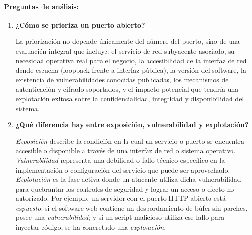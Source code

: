 \paragraph{Preguntas de análisis:}
\begin{enumerate}
    \item \textbf{¿Cómo se prioriza un puerto abierto?}\par
    La priorización no depende únicamente del número del puerto, sino de una evaluación integral que incluye: el servicio de red subyacente asociado, su necesidad operativa real para el negocio, la accesibilidad de la interfaz de red donde escucha (loopback frente a interfaz pública), la versión del software, la existencia de vulnerabilidades conocidas publicadas, los mecanismos de autenticación y cifrado soportados, y el impacto potencial que tendría una explotación exitosa sobre la confidencialidad, integridad y disponibilidad del sistema.
    \item \textbf{¿Qué diferencia hay entre exposición, vulnerabilidad y explotación?}\par
    \textit{Exposición} describe la condición en la cual un servicio o puerto se encuentra accesible o disponible a través de una interfaz de red o sistema operativo. \textit{Vulnerabilidad} representa una debilidad o fallo técnico específico en la implementación o configuración del servicio que puede ser aprovechado. \textit{Explotación} es la fase activa donde un atacante utiliza dicha vulnerabilidad para quebrantar los controles de seguridad y lograr un acceso o efecto no autorizado. Por ejemplo, un servidor con el puerto HTTP abierto está \textit{expuesto}; si el software web contiene un desbordamiento de búfer sin parches, posee una \textit{vulnerabilidad}; y si un script malicioso utiliza ese fallo para inyectar código, se ha concretado una \textit{explotación}.
\end{enumerate}

